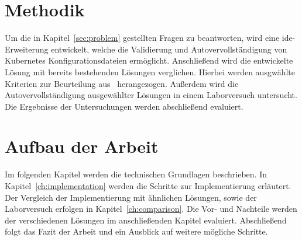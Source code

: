 \section{Methodik}
Um die in Kapitel~\ref{sec:problem} gestellten Fragen zu beantworten, wird eine \acs{ide}-Erweiterung entwickelt, welche die Validierung und Autovervollständigung von
Kubernetes Konfigurationsdateien ermöglicht. Anschließend wird die entwickelte Lösung mit bereits bestehenden Lösungen verglichen.
Hierbei werden ausgwählte Kriterien zur Beurteilung aus~\cite[A Large-Scale Study of Usability Criteria Addressed by Static Analysis Tools]{usability-criteria-static-analysis-tools} herangezogen.
Außerdem wird die Autovervollständigung ausgewählter Lösungen in einem Laborversuch untersucht.
Die Ergebnisse der Untersuchungen werden abschließend evaluiert.

\section{Aufbau der Arbeit}
Im folgenden Kapitel werden die technischen Grundlagen beschrieben. In Kapitel~\ref{ch:implementation} werden die Schritte zur Implementierung erläutert.
Der Vergleich der Implementierung mit ähnlichen Lösungen, sowie der Laborversuch erfolgen in Kapitel~\ref{ch:comparison}.
Die Vor- und Nachteile werden der verschiedenen Lösungen im anschließenden Kapitel evaluiert.
Abschließend folgt das Fazit der Arbeit und ein Ausblick auf weitere mögliche Schritte.